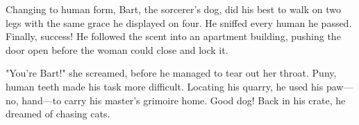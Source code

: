 
Changing to human form, Bart, the sorcerer's dog, did his best to walk
on two legs with the same grace he displayed on four. He sniffed every
human he passed. Finally, success! He followed the scent into an
apartment building, pushing the door open before the woman could close
and lock it.

"You're Bart!" she screamed, before he managed to tear out her throat.
Puny, human teeth made his task more difficult. Locating his quarry, he
used his paw---no, hand---to carry his master's grimoire home. Good dog!
Back in his crate, he dreamed of chasing cats.
